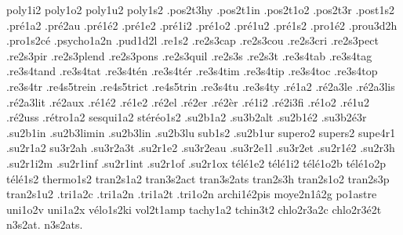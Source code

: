{poly1i2
poly1o2
poly1u2
poly1s2
.pos2t3hy
.pos2t1in
.pos2t1o2
.pos2t3r
.post1s2
.pr\'e1a2
.pr\'e2au
.pr\'e1\'e2
.pr\'e1e2
.pr\'e1i2
.pr\'e1o2
.pr\'e1u2
.pr\'e1s2
.pro1\'e2
.prou3d2h
.pro1s2c\'e
.psycho1a2n
.pud1d2l
.re1s2
.re2s3cap
.re2s3cou
.re2s3cri
.re2s3pect
.re2s3pir
.re2s3plend
.re2s3pons
.re2s3quil
.re2s3s
.re2s3t
.re3s4tab
.re3s4tag
.re3s4tand
.re3s4tat
.re3s4t\'en
.re3s4t\'er
.re3s4tim
.re3s4tip
.re3s4toc
.re3s4top
.re3s4tr
.re4s5trein
.re4s5trict
.re4s5trin
.re3s4tu
.re3s4ty
.r\'e1a2
.r\'e2a3le
.r\'e2a3lis
.r\'e2a3lit
.r\'e2aux
.r\'e1\'e2
.r\'e1e2
.r\'e2el
.r\'e2er
.r\'e2\`er
.r\'e1i2
.r\'e2i3fi
.r\'e1o2
.r\'e1u2
.r\'e2uss
.r\'etro1a2
sesqui1a2
st\'er\'eo1s2
.su2b1a2
.su3b2alt
.su2b1\'e2
.su3b2\'e3r
.su2b1in
.su2b3limin
.su2b3lin
.su2b3lu
sub1s2
.su2b1ur
supero2
supers2
supe4r1
.su2r1a2
su3r2ah
.su3r2a3t
.su2r1e2
.su3r2eau
.su3r2e1l
.su3r2et
.su2r1\'e2
.su2r3h
.su2r1i2m
.su2r1inf
.su2r1int
.su2r1of
.su2r1ox
t\'el\'e1e2
t\'el\'e1i2
t\'el\'e1o2b
t\'el\'e1o2p
t\'el\'e1s2
thermo1s2
tran2s1a2
tran3s2act
tran3s2ats
tran2s3h
tran2s1o2
tran2s3p
tran2s1u2
.tri1a2c
.tri1a2n
.tri1a2t
.tri1o2n
archi1\'e2pis
moye2n1\^a2g
po1astre
uni1o2v
uni1a2x
v\'elo1s2ki
vol2t1amp
tachy1a2
tchin3t2
chlo2r3a2c
chlo2r3\'e2t
n3s2at.
n3s2ats.
}
\endgroup 
